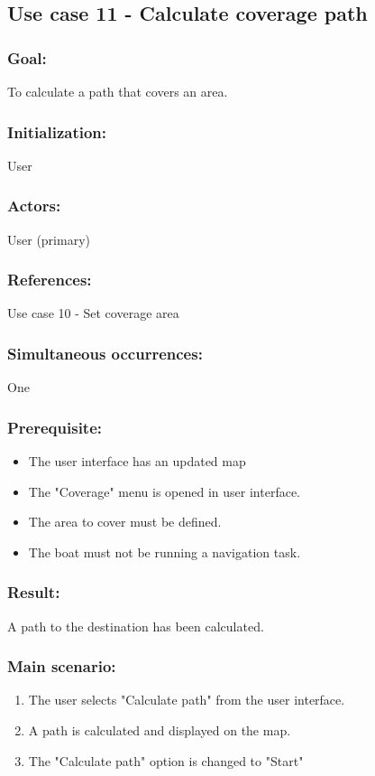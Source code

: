 
\subsection{Use case 11 - Calculate coverage path}
\subsubsection*{Goal:}
To calculate a path that covers an area.

\subsubsection*{Initialization:}
User

\subsubsection*{Actors:}
User (primary)

\subsubsection*{References:}
Use case 10 - Set coverage area

\subsubsection*{Simultaneous occurrences:}
One 

\subsubsection*{Prerequisite:}
\begin{itemize}
	\item The user interface has an updated map
	\item The "Coverage" menu is opened in user interface.
	\item The area to cover must be defined.
	\item The boat must not be running a navigation task.
\end{itemize}

\subsubsection*{Result:}
A path to the destination has been calculated.

\subsubsection*{Main scenario:}
\begin{enumerate}
	\item The user selects "Calculate path" from the user interface.
	\item A path is calculated and displayed on the map. 
	\item The "Calculate path" option is changed to "Start"
\end{enumerate}	


